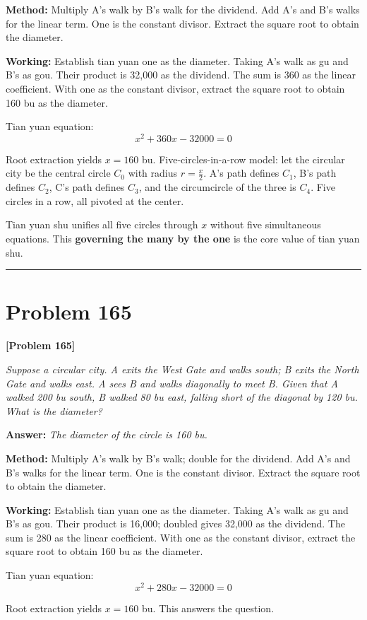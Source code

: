 \documentclass[11pt,a4paper]{book}
\newcommand{\answer}[1]{\noindent\textbf{\color{anacolor}Answer: }\textit{#1}\par}
\newcommand{\method}[1]{\noindent\textbf{\color{methodcolor}Method: }#1\par}
\newcommand{\working}[1]{\noindent\textbf{\color{workcolor}Working: }#1\par}
\newcommand{\shortline}{\noindent\rule{0.5\textwidth}{0.4pt}\par}
\begin{document}
\method{Multiply A's walk by B's walk for the dividend. Add A's and B's walks for the linear term. One is the constant divisor. Extract the square root to obtain the diameter.}

\working{Establish tian yuan one as the diameter. Taking A's walk as gu and B's as gou. Their product is 32,000 as the dividend. The sum is 360 as the linear coefficient. With one as the constant divisor, extract the square root to obtain 160 bu as the diameter.

Tian yuan equation:
$$x^2 + 360x - 32000 = 0$$

Root extraction yields $x = 160$ bu. Five-circles-in-a-row model: let the circular city be the central circle $C_0$ with radius $r = \frac{x}{2}$. A's path defines $C_1$, B's path defines $C_2$, C's path defines $C_3$, and the circumcircle of the three is $C_4$. Five circles in a row, all pivoted at the center.

Tian yuan shu unifies all five circles through $x$ without five simultaneous equations. This \textbf{governing the many by the one} is the core value of tian yuan shu.}

\shortline

\section{Problem 165}
\label{sec:prob165}

\noindent\textbf{\color{probcolor}[Problem 165]}

\textit{Suppose a circular city. A exits the West Gate and walks south; B exits the North Gate and walks east. A sees B and walks diagonally to meet B. Given that A walked 200 bu south, B walked 80 bu east, falling short of the diagonal by 120 bu. What is the diameter?}

\answer{The diameter of the circle is 160 bu.}

\method{Multiply A's walk by B's walk; double for the dividend. Add A's and B's walks for the linear term. One is the constant divisor. Extract the square root to obtain the diameter.}

\working{Establish tian yuan one as the diameter. Taking A's walk as gu and B's as gou. Their product is 16,000; doubled gives 32,000 as the dividend. The sum is 280 as the linear coefficient. With one as the constant divisor, extract the square root to obtain 160 bu as the diameter.

Tian yuan equation:
$$x^2 + 280x - 32000 = 0$$

Root extraction yields $x = 160$ bu. This answers the question.}
\end{document}
